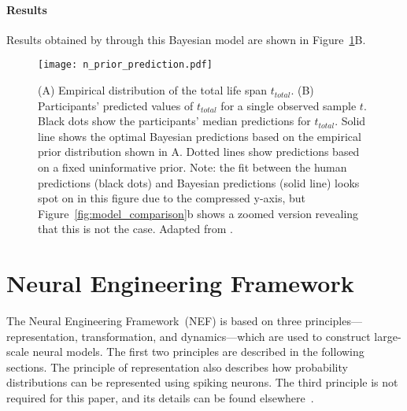 \documentclass[10pt,letterpaper]{article}
\begin{document}
\paragraph{Results}

Results obtained by  through this Bayesian model are shown in Figure~\ref{fig:model_prior_prediction}B. 


\begin{figure}[h]
\begin{center}
\texttt{[image: n\_prior\_prediction.pdf]}
\end{center}
\caption{(A) Empirical distribution of the total life span $t_{total}$. (B) Participants' predicted values of $t_{total}$ for a single observed sample $t$. Black dots show the participants' median predictions for $t_{total}$. Solid line shows the optimal Bayesian predictions based on the empirical prior distribution shown in A. Dotted lines show predictions based on a fixed uninformative prior. Note: the fit between the human predictions (black dots) and Bayesian predictions (solid line) looks spot on in this figure due to the compressed y-axis, but Figure~\ref{fig:model_comparison}b shows a zoomed version revealing that this is not the case. Adapted from .} 
\label{fig:model_prior_prediction}
\end{figure}


\section{Neural Engineering Framework}

The Neural Engineering Framework~(NEF) is based on three principles---representation, transformation, and dynamics---which are used to construct large-scale neural models. The first two principles are described in the following sections. The principle of representation also describes how probability distributions can be represented using spiking neurons. The third principle is not required for this paper, and its details can be found elsewhere~\cite{eliasmith2003neural}. 
\end{document}
